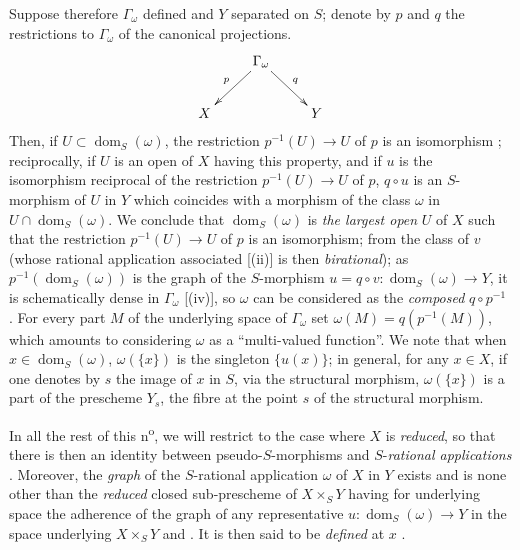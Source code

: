 \begin{env}[20.4.2]
\label{IV.20.4.2}
Suppose therefore $\Gamma_\omega$ defined and $Y$ separated on $S$;
denote by $p$ and $q$ the restrictions to $\Gamma_\omega$ of the canonical projections.
\[
  \xymatrix{
  & \Gamma_\omega \ar[dl]_p \ar[dr]^q & \\
  X & & Y
  }
\]
Then, if $U\subset\operatorname{dom}_S(\omega)$, the restriction $p^{-1}(U)\to U$ of $p$ is an isomorphism ;
reciprocally, if $U$ is an open of $X$ having this property, and if $u$ is the isomorphism reciprocal of the restriction $p^{-1}(U)\to U$ of $p$, $q\circ u$ is an $S$-morphism of $U$ in $Y$ which coincides with a morphism of the class $\omega$ in $U\cap\operatorname{dom}_S(\omega)$.
We conclude that $\operatorname{dom}_S(\omega)$ is \emph{the largest open} $U$ of $X$ such that the restriction $p^{-1}(U)\to U$ of $p$ is an isomorphism;
from the class of $v$ (whose rational application associated [(ii)] is then \emph{birational});
as $p^{-1}(\operatorname{dom}_S(\omega))$ is the graph of the $S$-morphism $u=q\circ v:\operatorname{dom}_S(\omega)\to Y$, it is schematically dense in $\Gamma_\omega$ [(iv)], so $\omega$ can be considered as the \emph{composed} $q\circ p^{-1}$ .
For every part $M$ of the underlying space of $\Gamma_\omega$ set $\omega(M)=q(p^{-1}(M))$, which amounts to considering $\omega$ as a ``multi-valued function''.
We note that when $x\in\operatorname{dom}_S(\omega)$, $\omega(\{x\})$ is the singleton $\{u(x)\}$;
in general, for any $x\in X$, if one denotes by $s$ the image of $x$ in $S$, via the structural morphism, $\omega(\{x\})$ is a part of the prescheme $Y_s$, the fibre at the point $s$ of the structural morphism.
\end{env}

\begin{env}[20.4.3]
\label{IV.20.4.3}
In all the rest of this n\textsuperscript{o}, we will restrict to the case where $X$ is \emph{reduced}, so that there is then an identity between pseudo-$S$-morphisms and $S$-\emph{rational applications} .
Moreover, the \emph{graph} of the $S$-rational application $\omega$ of $X$ in $Y$ exists and is none other than the \emph{reduced} closed sub-prescheme of $X\times_S Y$ having for underlying space the adherence of the graph of any representative $u:\operatorname{dom}_S(\omega)\to Y$ in the space underlying $X\times_S Y$  and .
It is then said to be \emph{defined} at $x$ .
\end{env}

